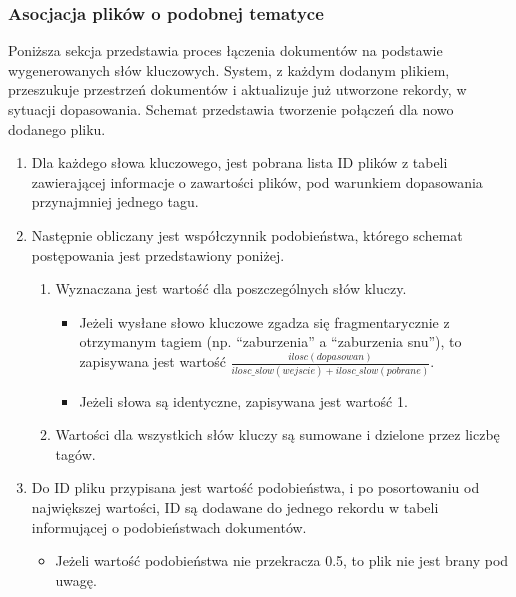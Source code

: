 \documentclass[12pt,a4paper,twoside]{article}
\begin{document}
\subsubsection*{Asocjacja plików o podobnej tematyce}
Poniższa sekcja przedstawia proces łączenia dokumentów na podstawie wygenerowanych słów kluczowych. System, z każdym dodanym plikiem, przeszukuje przestrzeń dokumentów i aktualizuje już utworzone rekordy, w sytuacji dopasowania. Schemat przedstawia tworzenie połączeń dla nowo dodanego pliku.
\begin{enumerate}
\item Dla każdego słowa kluczowego, jest pobrana lista ID plików z tabeli zawierającej informacje o zawartości plików, pod warunkiem dopasowania przynajmniej jednego tagu.
\item Następnie obliczany jest współczynnik podobieństwa, którego schemat postępowania jest przedstawiony poniżej.
	\begin{enumerate}
		\item Wyznaczana jest wartość dla poszczególnych słów kluczy.
		\begin{itemize}
			\item Jeżeli wysłane słowo kluczowe zgadza się fragmentarycznie z otrzymanym tagiem (np. ``zaburzenia'' a ``zaburzenia snu''), to zapisywana jest wartość $\frac{ilosc(dopasowan)}{ilosc\_slow(wejscie)+ilosc\_slow(pobrane)}$.
			\item Jeżeli słowa są identyczne, zapisywana jest wartość 1.
		\end{itemize}
		\item Wartości dla wszystkich słów kluczy są sumowane i dzielone przez liczbę tagów.
	\end{enumerate}
\item Do ID pliku przypisana jest wartość podobieństwa, i po posortowaniu od największej wartości, ID są dodawane do jednego rekordu w tabeli informującej o podobieństwach dokumentów.
	\begin{itemize}
		\item Jeżeli wartość podobieństwa nie przekracza 0.5, to plik nie jest brany pod uwagę.
	\end{itemize}
\end{enumerate}
\newpage
\end{document}
